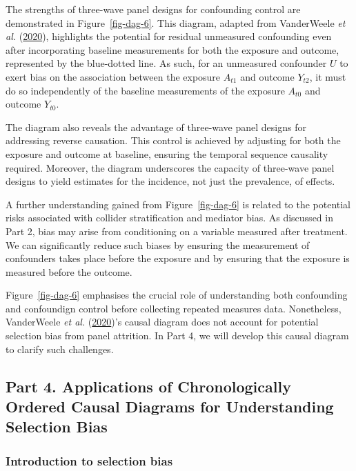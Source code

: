 \documentclass[
  singlecolumn]{article}
\begin{document}
The strengths of three-wave panel designs for confounding control are
demonstrated in Figure~\ref{fig-dag-6}. This diagram, adapted from
VanderWeele \emph{et al.}
(\protect\hyperlink{ref-vanderweele2020}{2020}), highlights the
potential for residual unmeasured confounding even after incorporating
baseline measurements for both the exposure and outcome, represented by
the blue-dotted line. As such, for an unmeasured confounder \(U\) to
exert bias on the association between the exposure \(A_{t1}\) and
outcome \(Y_{t2}\), it must do so independently of the baseline
measurements of the exposure \(A_{t0}\) and outcome \(Y_{t0}\).

The diagram also reveals the advantage of three-wave panel designs for
addressing reverse causation. This control is achieved by adjusting for
both the exposure and outcome at baseline, ensuring the temporal
sequence causality required. Moreover, the diagram underscores the
capacity of three-wave panel designs to yield estimates for the
incidence, not just the prevalence, of effects.

A further understanding gained from Figure~\ref{fig-dag-6} is related to
the potential risks associated with collider stratification and mediator
bias. As discussed in Part 2, bias may arise from conditioning on a
variable measured after treatment. We can significantly reduce such
biases by ensuring the measurement of confounders takes place before the
exposure and by ensuring that the exposure is measured before the
outcome.

Figure~\ref{fig-dag-6} emphasises the crucial role of understanding both
confounding and confoundign control before collecting repeated measures
data. Nonetheless, VanderWeele \emph{et al.}
(\protect\hyperlink{ref-vanderweele2020}{2020})'s causal diagram does
not account for potential selection bias from panel attrition. In Part
4, we will develop this causal diagram to clarify such challenges.

\hypertarget{part-4.-applications-of-chronologically-ordered-causal-diagrams-for-understanding-selection-bias}{%
\subsection{Part 4. Applications of Chronologically Ordered Causal
Diagrams for Understanding Selection
Bias}\label{part-4.-applications-of-chronologically-ordered-causal-diagrams-for-understanding-selection-bias}}

\hypertarget{introduction-to-selection-bias}{%
\subsubsection{Introduction to selection
bias}\label{introduction-to-selection-bias}}
\end{document}
